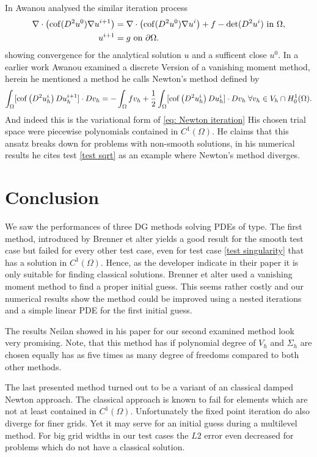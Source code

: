In \cite{Awanou2014} Awanou analysed the similar iteration process
\begin{align}
	\nabla \cdot \left( \operatorname{cof}(D^2 u^0) \nabla u^{i+1} \right) &= \nabla \cdot \left( \operatorname{cof}(D^2 u^0) \nabla u^{i} \right) + f - \operatorname{det} (D^2u^i) \textnormal{ in } \Omega,  \label{eq: Awanout eq}\\
	u^{i+1} &= g \textnormal{ on } \partial \Omega.
\end{align}
showing convergence for the analytical solution $u$ and a sufficent close $u^0$. 
In a earlier work \cite{Awanou2010} Awanou examined a discrete Version of a vanishing moment method, herein he mentioned a method he calls Newton's method defined by
\[
	\int_{\Omega} [\operatorname{cof} \left(  D^2 u_h^i \right) Du_h^{i+1}] \cdot Dv_h = -	\int_{\Omega} f v_h + \frac 1 2 \int_{\Omega} [\operatorname{cof} \left(  D^2 u_h^i \right) Du_h^{i}] \cdot Dv_h \; \forall v_h \in V_h \cap H^1_0 (\Omega)  \label{eq: Awanout eq2}.
\]
And indeed this is the variational form of \eqref{eq: Newton iteration}
His chosen trial space were piecewise polynomials contained in $C^1(\Omega)$. He claims that this ansatz breaks down for problems with non-smooth solutions, in his numerical results he cites test \ref{test sqrt} as an example where Newton's method diverges.


\section{Conclusion}

We saw the performances of three DG methods solving PDEs of \MA type.
The first method, introduced by Brenner et alter yields a good result for the smooth test case but failed for every other test case, even for test case \ref{test singularity} that has a solution in $C^1(\Omega)$. Hence, as the developer indicate in their paper it is only suitable for finding classical solutions.
Brenner et alter used a vanishing moment method to find a proper initial guess. This seems rather costly and our numerical results show the method could be improved using a nested iterations and a simple linear PDE for the first initial guess.

The results Neilan showed in his paper for our second examined method look very promising.
Note, that this method has if polynomial degree of $V_h$ and $\Sigma_h$ are chosen equally has as five times as many degree of freedoms compared to both other methods.

The last presented method turned out to be a variant of an classical damped Newton approach. 
The classical approach is known to fail for elements which are not at least contained in $C^1(\Omega)$. Unfortunately the fixed point iteration do also diverge for finer grids. Yet it may serve for an initial guess during a multilevel method. For big grid widths in our test cases the $L2$ error even decreased for problems which do not have a classical solution.

